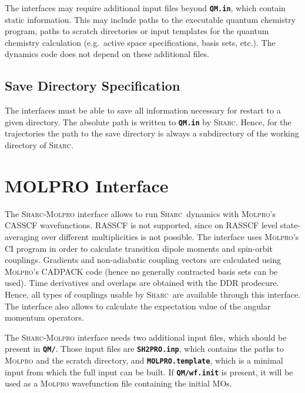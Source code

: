 \documentclass[a4paper,11pt,DIV=15,openany,twoside=false]{scrbook}
\newcommand{\sharc}{\textsc{Sharc}}
\newcommand{\ttt}[1]{\textbf{\texttt{#1}}}
\begin{document}
The interfaces may require additional input files beyond \ttt{QM.in}, which contain static information. This may include paths to the executable quantum chemistry program, paths to scratch directories or input templates for the quantum chemistry calculation (e.g.\ active space specifications, basis sets, etc.).
The dynamics code does not depend on these additional files.

\subsection{Save Directory Specification}

The interfaces must be able to save all information necessary for restart to a given directory. The absolute path is written to \ttt{QM.in} by \sharc. Hence, for the trajectories the path to the save directory is always a subdirectory of the working directory of \sharc.


\clearpage
\section{MOLPRO Interface}\label{sec:int:molpro}

The \sharc-\textsc{Molpro} interface allows to run \sharc\ dynamics with \textsc{Molpro}'s CASSCF wavefunctions. RASSCF is not supported, since on RASSCF level state-averaging over different multiplicities is not possible. The interface uses \textsc{Molpro}'s CI program in order to calculate transition dipole moments and spin-orbit couplings. Gradients and non-adiabatic coupling vectors are calculated using \textsc{Molpro}'s CADPACK code (hence no generally contracted basis sets can be used). Time derivatives and overlaps are obtained with the DDR prodecure. Hence, all types of couplings usable by \sharc\ are available through this interface. The interface also allows to calculate the expectation value of the angular momentum operators.

The \sharc-\textsc{Molpro} interface needs two additional input files, which should be present in \ttt{QM/}. Those input files are \ttt{SH2PRO.inp}, which contains the paths to \textsc{Molpro} and the scratch directory, and \ttt{MOLPRO.template}, which is a minimal input from which the full input can be built. If \ttt{QM/wf.init} is present, it will be used as a \textsc{Molpro} wavefunction file containing the initial MOs.
\end{document}
